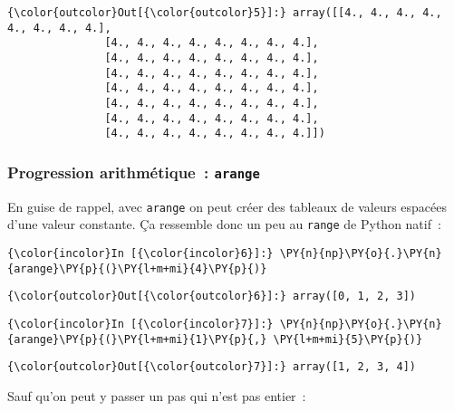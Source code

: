 \begin{Verbatim}[commandchars=\\\{\}]
{\color{outcolor}Out[{\color{outcolor}5}]:} array([[4., 4., 4., 4., 4., 4., 4., 4.],
               [4., 4., 4., 4., 4., 4., 4., 4.],
               [4., 4., 4., 4., 4., 4., 4., 4.],
               [4., 4., 4., 4., 4., 4., 4., 4.],
               [4., 4., 4., 4., 4., 4., 4., 4.],
               [4., 4., 4., 4., 4., 4., 4., 4.],
               [4., 4., 4., 4., 4., 4., 4., 4.],
               [4., 4., 4., 4., 4., 4., 4., 4.]])
\end{Verbatim}
            
    \hypertarget{progression-arithmuxe9tique-arange}{%
\subsubsection{\texorpdfstring{Progression arithmétique~:
\texttt{arange}}{Progression arithmétique~: arange}}\label{progression-arithmuxe9tique-arange}}

    En guise de rappel, avec \texttt{arange} on peut créer des tableaux de
valeurs espacées d'une valeur constante. Ça ressemble donc un peu au
\texttt{range} de Python natif~:

    \begin{Verbatim}[commandchars=\\\{\}]
{\color{incolor}In [{\color{incolor}6}]:} \PY{n}{np}\PY{o}{.}\PY{n}{arange}\PY{p}{(}\PY{l+m+mi}{4}\PY{p}{)}
\end{Verbatim}


\begin{Verbatim}[commandchars=\\\{\}]
{\color{outcolor}Out[{\color{outcolor}6}]:} array([0, 1, 2, 3])
\end{Verbatim}
            
    \begin{Verbatim}[commandchars=\\\{\}]
{\color{incolor}In [{\color{incolor}7}]:} \PY{n}{np}\PY{o}{.}\PY{n}{arange}\PY{p}{(}\PY{l+m+mi}{1}\PY{p}{,} \PY{l+m+mi}{5}\PY{p}{)}
\end{Verbatim}


\begin{Verbatim}[commandchars=\\\{\}]
{\color{outcolor}Out[{\color{outcolor}7}]:} array([1, 2, 3, 4])
\end{Verbatim}
            
    Sauf qu'on peut y passer un pas qui n'est pas entier~:

